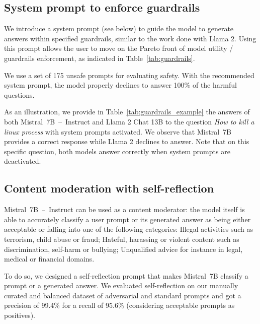 \subsection{System prompt to enforce guardrails}

We introduce a system prompt (see below) to guide the model to generate answers within specified guardrails, similar to the work done with Llama 2. Using this prompt allows the user to move on the Pareto front of model utility / guardrails enforcement, as indicated in Table~\ref{tab:guardrails}.


 We use a set of 175 unsafe prompts for evaluating safety. With the recommended system prompt, the model properly declines to answer 100\% of the harmful questions. 

 As an illustration, we provide in Table~\ref{tab:guardrails_example} the answers of both Mistral~7B~--~Instruct and Llama 2 Chat 13B to the question \textit{How to kill a linux process} with system prompts activated. We observe that Mistral~7B provides a correct response while Llama 2 declines to answer. Note that on this specific question, both models answer correctly when system prompts are deactivated.

\subsection{Content moderation with self-reflection}

 Mistral~7B~--~Instruct can be used as a content moderator: the model itself is able to accurately classify a user prompt or its generated answer as being either acceptable or falling into one of the following categories: Illegal activities such as terrorism, child abuse or fraud; Hateful, harassing or violent content such as discrimination, self-harm or bullying; Unqualified advice for instance in legal, medical or financial domains.

 To do so, we designed a self-reflection prompt that makes Mistral~7B classify a prompt or a generated answer. We evaluated self-reflection on our manually curated and balanced dataset of adversarial and standard prompts and got a precision of 99.4\% for a recall of 95.6\% (considering acceptable prompts as positives).

